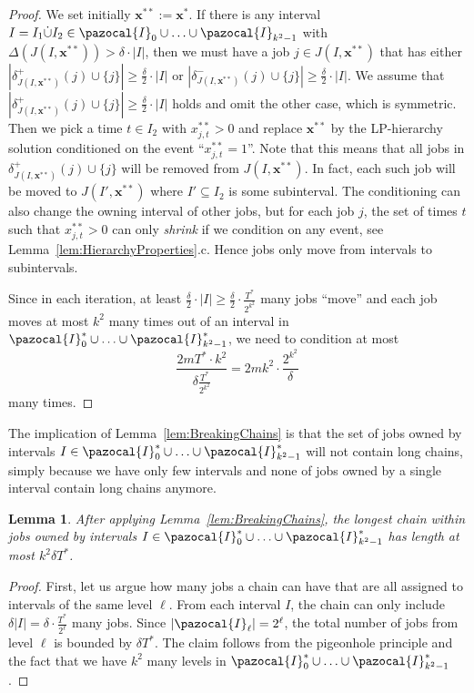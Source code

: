 \documentclass[11pt,letterpaper,oneside,english]{article}
\theoremstyle{theorem}
\newtheorem{lemma}[theorem]{Lemma}
\begin{document}
\begin{proof}
We set initially $\bm{x}^{**}:= \bm{x}^*$. If there is any interval $I = I_1
\dot{\cup} I_2 \in \pazocal{I}_0 \cup \ldots \cup \pazocal{I}_{k^2-1}$ with
$\Delta(J(I,\bm{x}^{**})) > \delta \cdot |I|$, then we must have a job
$j \in J(I,\bm{x}^{**})$
that has either $|\delta^+_{J(I,\bm{x}^{**})}(j) \cup \{ j\}| \geq
\frac{\delta}{2} \cdot  |I|$ or 
$|\delta^-_{J(I,\bm{x}^{**})}(j) \cup \{ j\}| \geq
\frac{\delta}{2} \cdot  |I|$. We assume that 
$|\delta^+_{J(I,\bm{x}^{**})}(j) \cup \{ j\}| \geq
\frac{\delta}{2} \cdot  |I|$ holds and omit the other case, which is symmetric.
Then we pick a time $t \in I_2$ with $x^{**}_{j,t} > 0$ and
 replace $\bm{x}^{**}$ by the LP-hierarchy solution conditioned on the
event ``$x_{j,t}^{**} = 1$''. Note that this
means that all jobs in $\delta_{J(I,\bm{x}^{**})}^+(j) \cup \{j\}$ will be removed
from $J(I,\bm{x}^{**})$. In fact, each such job will be moved to $J(I',\bm{x}^{**})$ where $I' \subseteq I_2$
is some subinterval. The conditioning can also change the owning interval of
other jobs, but for each job $j$, the set  of times $t$ such that $x_{j,t}^{**}>0$
can only \emph{shrink} if we condition on
any event, see Lemma~\ref{lem:HierarchyProperties}.c. 
Hence jobs only move from intervals to subintervals. 


Since in each iteration, at least $\frac{\delta}{2} \cdot |I| \geq \frac{\delta}{2} \cdot  \frac{T^*}{2^{k^2}}$ many
jobs ``move'' and each job moves at most 
$k^2$ many
times out of an interval
in $\pazocal{I}_0^* \cup \ldots \cup \pazocal{I}_{k^2-1}^*$, we need to condition at most 
\[
\frac{2mT^* \cdot k^2}{\delta \frac{T^*}{2^{k^2}}} = 2mk^2 \cdot \frac{2^{k^2}}{\delta}
\]
many times.
\end{proof}


The implication of Lemma~\ref{lem:BreakingChains} is that the set of jobs owned by
intervals $I \in \pazocal{I}_0^* \cup \ldots \cup \pazocal{I}_{k^2-1}^*$ will not contain long chains,
simply because we have only few intervals and none of jobs owned
by a single interval contain long chains anymore.
\begin{lemma} \label{lem:BoundedChains}
After applying Lemma~\ref{lem:BreakingChains}, the longest chain within
jobs owned by intervals $I \in \pazocal{I}_0^* \cup \ldots \cup \pazocal{I}_{k^2-1}^*$
has length at most $k^2 \delta T^*$.
\end{lemma}
\begin{proof}
First, let us argue how many jobs a chain can have that are all assigned
to intervals of the same level
$\ell$. From each interval $I$, the chain can only include $\delta |I| = \delta \cdot
\frac{T^*}{2^{\ell}}$ many jobs.
Since $|\pazocal{I}_{\ell}| = 2^{\ell}$, the total number of jobs from
level $\ell$ is bounded by $\delta T^*$.
The claim follows from the pigeonhole principle and the fact that we have $k^2$
many levels in $\pazocal{I}_0^* \cup \ldots \cup \pazocal{I}_{k^2-1}^*$.
\end{proof}
\end{document}
